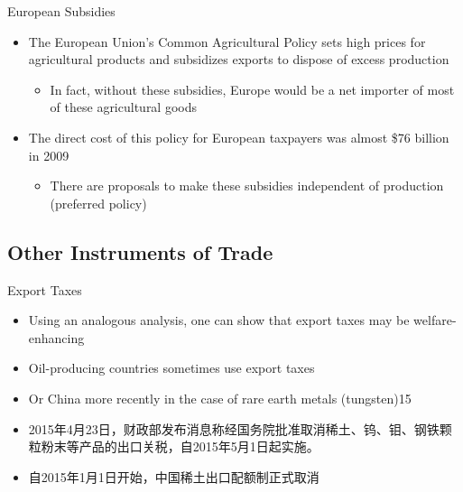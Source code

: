 \documentclass[10pt,hyperref={CJKbookmarks=true},xcolor=dvipsnames,aspectratio=169]{beamer}
\begin{document}
\begin{frame}{European Subsidies}

\begin{itemize}
\item The European Union’s Common Agricultural Policy sets high prices for
agricultural products and subsidizes exports to dispose of excess
production 

\begin{itemize}
\item In fact, without these subsidies, Europe would be a net importer of
most of these agricultural goods 
\end{itemize}
\item The direct cost of this policy for European taxpayers was almost \$76
billion in 2009 

\begin{itemize}
\item There are proposals to make these subsidies independent of production
(preferred policy)
\end{itemize}
\end{itemize}
\end{frame}



\subsection{Other Instruments of Trade}
\begin{frame}{Export Taxes}

\begin{itemize}
\item Using an analogous analysis, one can show that export taxes may be
welfare-enhancing 
\item Oil-producing countries sometimes use export taxes 
\item Or China more recently in the case of rare earth metals (tungsten)15%
\item 2015年4月23日，财政部发布消息称经国务院批准取消稀土、钨、钼、钢铁颗粒粉末等产品的出口关税，自2015年5月1日起实施。
\item 自2015年1月1日开始，中国稀土出口配额制正式取消
\end{itemize}
\end{frame}
\end{document}
